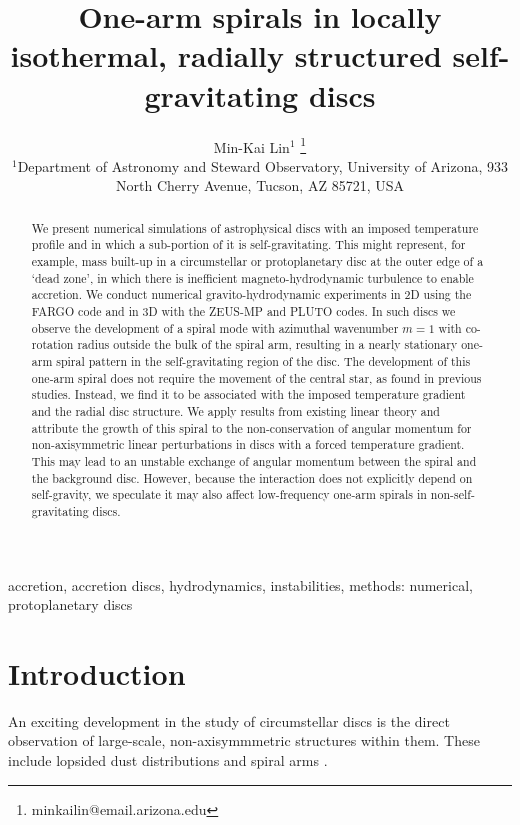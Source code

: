 \documentclass[useAMS,usenatbib]{mn2e}
\title[One-arm spirals]{One-arm spirals in 
  locally isothermal, radially structured self-gravitating discs}
\author[Lin]{Min-Kai Lin$^{1}$
  \thanks{ minkailin@email.arizona.edu} \\ 
  $^1$Department of Astronomy and Steward Observatory, University of
  Arizona, 933 North Cherry Avenue, Tucson, AZ 85721, USA 
}
\begin{document}
\maketitle
\begin{abstract} 
  We present numerical simulations of astrophysical discs with an 
  imposed temperature profile and in which a sub-portion of it is
  self-gravitating. This might represent, for example, mass  
  built-up in a circumstellar or protoplanetary
  disc at the outer edge of a `dead zone', in which there
  is inefficient magneto-hydrodynamic turbulence to enable accretion. 
  We conduct numerical gravito-hydrodynamic experiments in 2D using
  the FARGO code and in 3D with the ZEUS-MP and PLUTO codes. In such
  discs we observe the development of a 
  spiral mode with azimuthal wavenumber $m=1$ with co-rotation radius 
  outside the bulk of the spiral arm, resulting in a nearly stationary 
  one-arm spiral pattern in the self-gravitating region of the
  disc. The development of this one-arm 
  spiral does not require the movement of  
  the central star, as found in previous studies. Instead, we find it 
  to be associated with the imposed 
  temperature gradient and the radial disc structure. 
  We apply results from existing linear theory and attribute the
  growth of this spiral to the non-conservation of angular momentum
  for non-axisymmetric linear perturbations in discs with a forced temperature
  gradient. This may lead to an unstable exchange of angular momentum between the spiral 
  and the background disc. However, because the interaction does
  not explicitly depend on self-gravity, we speculate it may also
  affect low-frequency one-arm spirals in non-self-gravitating
  discs. 
\end{abstract}

\begin{keywords}
  accretion, accretion discs, hydrodynamics, instabilities, methods: numerical, protoplanetary discs 
\end{keywords}

\section{Introduction}\label{intro}
An exciting development in the study of circumstellar 
discs is the direct observation of large-scale, non-axisymmmetric
structures within them. These
include lopsided dust distributions 
\citep{marel13,fukagawa13,casassus13,isella13,perez14,follette14} and
spiral arms 
\citep{hashimoto11,muto12,boccaletti14,grady13,christiaens14,avenhaus14}. 
\end{document}
